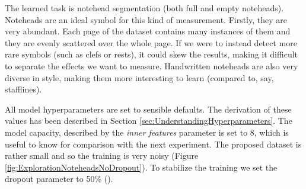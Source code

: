 The learned task is notehead segmentation (both full and empty noteheads). Noteheads are an ideal symbol for this kind of measurement. Firstly, they are very abundant. Each page of the dataset contains many instances of them and they are evenly scattered over the whole page. If we were to instead detect more rare symbols (such as clefs or rests), it could skew the results, making it difficult to separate the effects we want to measure. Handwritten noteheads are also very diverse in style, making them more interesting to learn (compared to, say, stafflines).

All model hyperparameters are set to sensible defaults. The derivation of these values has been described in Section \ref{sec:UnderstandingHyperparameters}. The model capacity, described by the \emph{inner features} parameter is set to 8, which is useful to know for comparison with the next experiment. The proposed dataset is rather small and so the training is very noisy (Figure \ref{fig:ExplorationNoteheadsNoDropout}). To stabilize the training we set the dropout parameter to 50\% (\cite{Dropout}).

